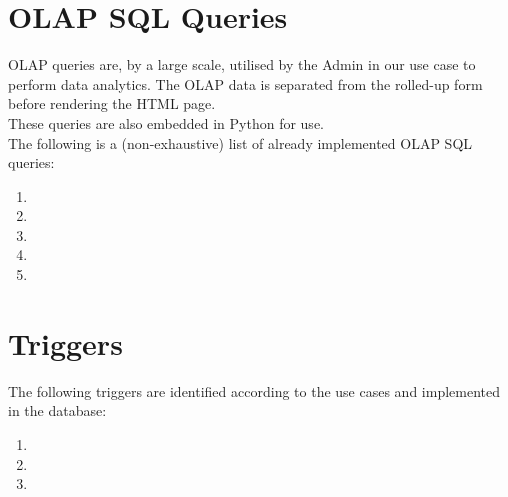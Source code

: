 \section*{\Huge OLAP SQL Queries}
\vspace*{10pt}

OLAP queries are, by a large scale, utilised by the Admin in our use case to perform data analytics.
The OLAP data is separated from the rolled-up form before rendering the HTML page. \\
These queries are also embedded in Python for use.
\vspace*{10pt} \\
The following is a (non-exhaustive) list of already implemented OLAP SQL queries:

\begin{enumerate}
    \item 
    \item 
    \item 
    \item 
    \item 
\end{enumerate}

\section*{\Huge Triggers}

The following triggers are identified according to the use cases and implemented in the database:

\begin{enumerate}
    \item 
    \item 
    \item 
\end{enumerate}

\vfill \pagebreak